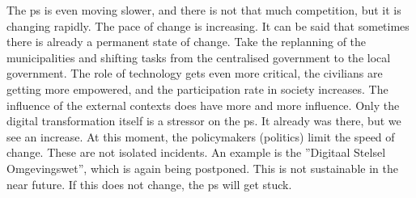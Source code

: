 The \gls{ps} is even moving slower, and there is not that much competition, but it is changing rapidly. The pace of change is increasing. It can be said that sometimes there is already a permanent state of change. Take the replanning of the municipalities and shifting tasks from the centralised government to the local government. The role of technology gets even more critical, the civilians are getting more empowered, and the participation rate in society increases. The influence of the external contexts does have more and more influence. Only the digital transformation itself is a stressor on the \gls{ps}. It already was there, but we see an increase. At this moment, the policymakers (politics) limit the speed of change.
These are not isolated incidents. An example is the ''Digitaal Stelsel Omgevingswet'', which is again being postponed. This is not sustainable in the near future. If this does not change, the \gls{ps} will get stuck.
